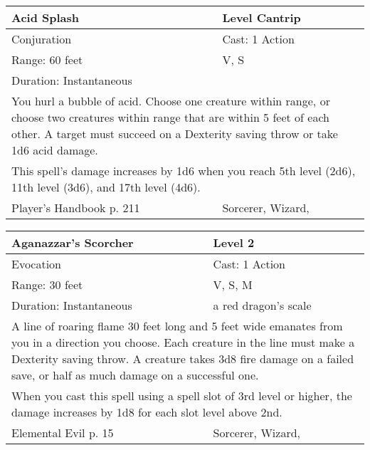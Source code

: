 \documentclass[11pt]{report}
\begin{document}
\begin{table}[H]
	\begin{tabular}{||p{6cm}|p{6cm}||}
		\hline\hline
		\bf{Acid Splash} & Level Cantrip\\ \hline
		Conjuration & Cast: 1 Action\\ \hline
		Range: 60 feet & V, S\\ \hline
		Duration: Instantaneous & \\ \hline
		\multicolumn{2}{||p{12cm}||}{You hurl a bubble of acid. 
Choose one creature within range, or choose two creatures within range that are within 5 feet of each other. A target must succeed on a Dexterity saving throw or take 1d6 acid damage.}\\ \hline
		\multicolumn{2}{||p{12cm}||}{This spell’s damage increases by 1d6 when you reach 5th level (2d6), 11th level (3d6), and 17th level (4d6).}\\ \hline
Player's Handbook p. 211 & Sorcerer, Wizard, \\ \hline\hline
	\end{tabular}
\end{table}

\begin{table}[H]
	\begin{tabular}{||p{6cm}|p{6cm}||}
		\hline\hline
		\bf{Aganazzar’s Scorcher} & Level 2\\ \hline
		Evocation & Cast: 1 Action\\ \hline
		Range: 30 feet & V, S, M\\ \hline
		Duration: Instantaneous & a red dragon’s scale\\ \hline
		\multicolumn{2}{||p{12cm}||}{A line of roaring flame 30 feet long and 5 feet wide emanates from you in a direction you choose. 
Each creature in the line must make a Dexterity saving throw. A creature takes 3d8 fire damage on a failed save, or half as much damage on a successful one.}\\ \hline
		\multicolumn{2}{||p{12cm}||}{When you cast this spell using a spell slot of 3rd level or higher, the damage increases by 1d8 for each slot level above 2nd.}\\ \hline
Elemental Evil p. 15 & Sorcerer, Wizard, \\ \hline\hline
	\end{tabular}
\end{table}
\end{document}
